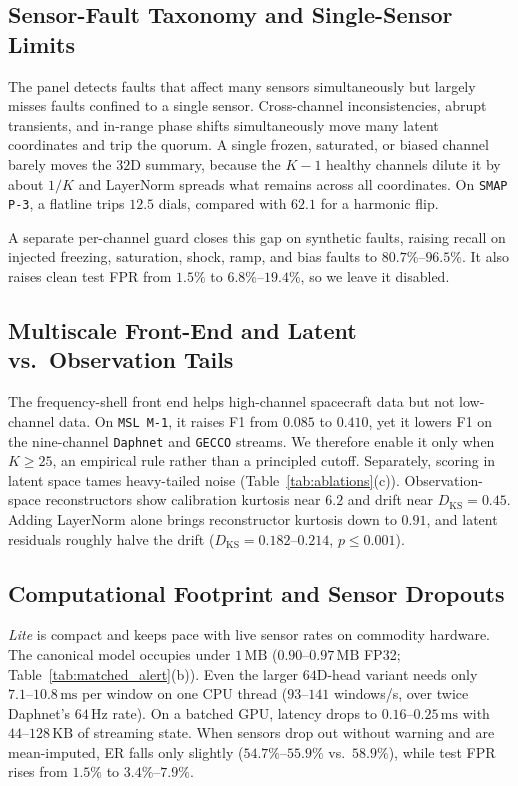 \documentclass[journal]{IEEEtran}
\begin{document}
\subsection{Sensor-Fault Taxonomy and Single-Sensor Limits}
\label{subsec:gating_ablation}
The panel detects faults that affect many sensors simultaneously but largely misses faults confined to a single sensor. Cross-channel inconsistencies, abrupt transients, and in-range phase shifts simultaneously move many latent coordinates and trip the quorum. A single frozen, saturated, or biased channel barely moves the $32$D summary, because the $K-1$ healthy channels dilute it by about $1/K$ and LayerNorm spreads what remains across all coordinates. On \texttt{SMAP P-3}, a flatline trips $12.5$ dials, compared with $62.1$ for a harmonic flip.

A separate per-channel guard closes this gap on synthetic faults, raising recall on injected freezing, saturation, shock, ramp, and bias faults to $80.7\%\text{--}96.5\%$. It also raises clean test FPR from $1.5\%$ to $6.8\%\text{--}19.4\%$, so we leave it disabled.

\subsection{Multiscale Front-End and Latent vs.\ Observation Tails}
\label{subsec:dyadic_ablation}
\label{subsec:controlled_backbone}
The frequency-shell front end helps high-channel spacecraft data but not low-channel data. On \texttt{MSL M-1}, it raises F1 from $0.085$ to $0.410$, yet it lowers F1 on the nine-channel \texttt{Daphnet} and \texttt{GECCO} streams. We therefore enable it only when $K \ge 25$, an empirical rule rather than a principled cutoff. Separately, scoring in latent space tames heavy-tailed noise (Table~\ref{tab:ablations}(c)). Observation-space reconstructors show calibration kurtosis near $6.2$ and drift near $D_{\text{KS}}=0.45$. Adding LayerNorm alone brings reconstructor kurtosis down to $0.91$, and latent residuals roughly halve the drift ($D_{\text{KS}}=0.182\text{--}0.214$, $p\le 0.001$).

\subsection{Computational Footprint and Sensor Dropouts}
\label{subsec:computational_deployment}
\emph{Lite} is compact and keeps pace with live sensor rates on commodity hardware. The canonical model occupies under $1\,\text{MB}$ ($0.90\text{--}0.97\,\text{MB}$ FP32; Table~\ref{tab:matched_alert}(b)). Even the larger $64$D-head variant needs only $7.1\text{--}10.8\,\text{ms}$ per window on one CPU thread ($93\text{--}141$ windows/s, over twice Daphnet's $64\,\text{Hz}$ rate). On a batched GPU, latency drops to $0.16\text{--}0.25\,\text{ms}$ with $44\text{--}128\,\text{KB}$ of streaming state. When sensors drop out without warning and are mean-imputed, ER falls only slightly ($54.7\%\text{--}55.9\%$ vs.\ $58.9\%$), while test FPR rises from $1.5\%$ to $3.4\%\text{--}7.9\%$.
\end{document}
